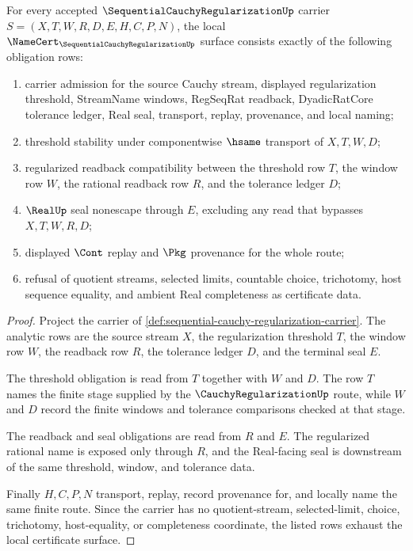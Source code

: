 \begin{theorem}
\label{thm:sequential-cauchy-regularization-namecert-obligations}
For every accepted $\SequentialCauchyRegularizationUp$ carrier $S=(X,T,W,R,D,E,H,C,P,N)$, the local $\NameCert_{\SequentialCauchyRegularizationUp}$ surface consists exactly of the following obligation rows:
\begin{enumerate}
\item carrier admission for the source Cauchy stream, displayed regularization threshold, StreamName windows, RegSeqRat readback, DyadicRatCore tolerance ledger, Real seal, transport, replay, provenance, and local naming;
\item threshold stability under componentwise $\hsame$ transport of $X,T,W,D$;
\item regularized readback compatibility between the threshold row $T$, the window row $W$, the rational readback row $R$, and the tolerance ledger $D$;
\item $\RealUp$ seal nonescape through $E$, excluding any read that bypasses $X,T,W,R,D$;
\item displayed $\Cont$ replay and $\Pkg$ provenance for the whole route;
\item refusal of quotient streams, selected limits, countable choice, trichotomy, host sequence equality, and ambient Real completeness as certificate data.
\end{enumerate}
\end{theorem}
\begin{proof}
Project the carrier of \autoref{def:sequential-cauchy-regularization-carrier}. The analytic rows are the source stream $X$, the regularization threshold $T$, the window row $W$, the readback row $R$, the tolerance ledger $D$, and the terminal seal $E$.

The threshold obligation is read from $T$ together with $W$ and $D$. The row $T$ names the finite stage supplied by the $\CauchyRegularizationUp$ route, while $W$ and $D$ record the finite windows and tolerance comparisons checked at that stage.

The readback and seal obligations are read from $R$ and $E$. The regularized rational name is exposed only through $R$, and the Real-facing seal is downstream of the same threshold, window, and tolerance data.

Finally $H,C,P,N$ transport, replay, record provenance for, and locally name the same finite route. Since the carrier has no quotient-stream, selected-limit, choice, trichotomy, host-equality, or completeness coordinate, the listed rows exhaust the local certificate surface.
\end{proof}

